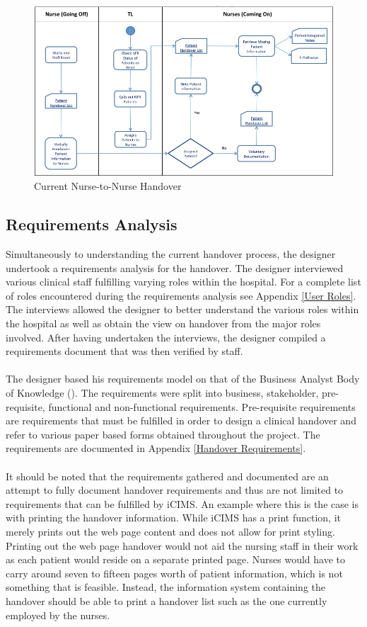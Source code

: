 \begin{figure}[hp]
				\centering
				\includegraphics[angle=-90,scale=1.0, width=120mm]{Images/Nurse-to-Nurse-Handover-Process-As-Is}
				\caption{Current Nurse-to-Nurse Handover}
				\label{Current Nurse-to-Nurse Handover}
\end{figure} 
\newpage

\subsection{Requirements Analysis}
Simultaneously to understanding the current handover process, the designer undertook a requirements analysis for the handover. The designer interviewed various clinical staff fulfilling varying roles within the hospital. For a complete list of roles encountered during the requirements analysis see Appendix \ref{User Roles}. The interviews allowed the designer to better understand the various roles within the hospital as well as obtain the view on handover from the major roles involved. After having undertaken the interviews, the designer compiled a requirements document that was then verified by staff. 
\\ \\ 
The designer based his requirements model on that of the Business Analyst Body of Knowledge (\cite{IIBA}). The requirements were split into business, stakeholder, pre-requisite, functional and non-functional requirements. Pre-requisite requirements are requirements that must be fulfilled in order to design a clinical handover and refer to various paper based forms obtained throughout the project.  The requirements are documented in Appendix \ref{Handover Requirements}.
\\ \\
It should be noted that the requirements gathered and documented are an attempt to fully document handover requirements and thus are not limited to requirements that can be fulfilled by iCIMS. An example where this is the case is with printing the handover information. While iCIMS has a print function, it merely prints out the web page content and does not allow for print styling. Printing out the web page handover would not aid the nursing staff in their work as each patient would reside on a separate printed page. Nurses would have to carry around seven to fifteen pages worth of patient information, which is not something that is feasible. Instead, the information system containing the handover should be able to print a handover list such as the one currently employed by the nurses.


